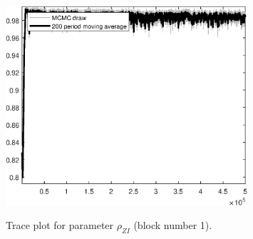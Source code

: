 \begin{figure}[H]
\centering
  \includegraphics[width=0.8\textwidth]{BRS_growth_ext_shopping/graphs/TracePlot_rho_ZI_blck_1}\\
    \caption{Trace plot for parameter ${\rho_{ZI}}$ (block number 1).}
\end{figure}
